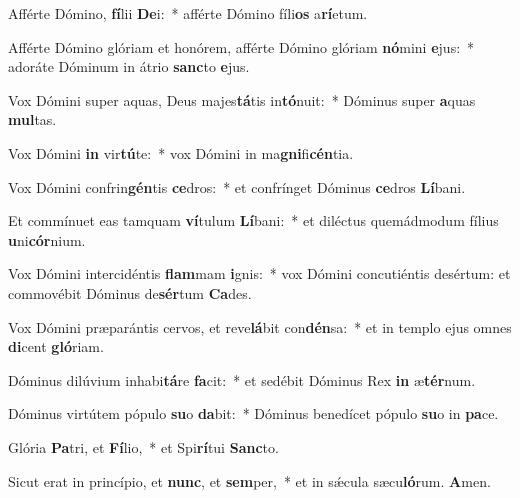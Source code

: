 \item Afférte Dómino, \textbf{fí}lii \textbf{De}i:~* afférte Dómino fíli\textbf{os} a\textbf{rí}etum.
\item Afférte Dómino glóriam et honórem, afférte Dómino glóriam \textbf{nó}mini \textbf{e}jus:~* adoráte Dóminum in átrio \textbf{sanc}to \textbf{e}jus.
\item Vox Dómini super aquas, Deus majes\textbf{tá}tis in\textbf{tó}nuit:~* Dóminus super \textbf{a}quas \textbf{mul}tas.
\item Vox Dómini \textbf{in} vir\textbf{tú}te:~* vox Dómini in ma\textbf{gni}fi\textbf{cén}tia.
\item Vox Dómini confrin\textbf{gén}tis \textbf{ce}dros:~* et confrínget Dóminus \textbf{ce}dros \textbf{Lí}bani.
\item Et commínuet eas tamquam \textbf{ví}tulum \textbf{Lí}bani:~* et diléctus quemádmodum fílius \textbf{u}ni\textbf{cór}nium.
\item Vox Dómini intercidéntis \textbf{flam}mam \textbf{i}gnis:~* vox Dómini concutiéntis desértum: et commovébit Dóminus de\textbf{sér}tum \textbf{Ca}des.
\item Vox Dómini præparántis cervos, et reve\textbf{lá}bit con\textbf{dén}sa:~* et in templo ejus omnes \textbf{di}cent \textbf{gló}riam.
\item Dóminus dilúvium inhabi\textbf{tá}re \textbf{fa}cit:~* et sedébit Dóminus Rex \textbf{in} æ\textbf{tér}num.
\item Dóminus virtútem pópulo \textbf{su}o \textbf{da}bit:~* Dóminus benedícet pópulo \textbf{su}o in \textbf{pa}ce.
\item Glória \textbf{Pa}tri, et \textbf{Fí}lio,~* et Spi\textbf{rí}tui \textbf{Sanc}to.
\item Sicut erat in princípio, et \textbf{nunc}, et \textbf{sem}per,~* et in sǽcula sæcu\textbf{ló}rum. \textbf{A}men.
